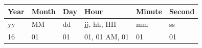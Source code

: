 \documentclass[12pt,]{article}
\begin{document}
\begin{longtable}[c]{@{}llllll@{}}
\toprule
\begin{minipage}[b]{0.08\columnwidth}\raggedright\strut
Year
\strut\end{minipage} &
\begin{minipage}[b]{0.09\columnwidth}\raggedright\strut
Month
\strut\end{minipage} &
\begin{minipage}[b]{0.07\columnwidth}\raggedright\strut
Day
\strut\end{minipage} &
\begin{minipage}[b]{0.20\columnwidth}\raggedright\strut
Hour
\strut\end{minipage} &
\begin{minipage}[b]{0.10\columnwidth}\raggedright\strut
Minute
\strut\end{minipage} &
\begin{minipage}[b]{0.10\columnwidth}\raggedright\strut
Second
\strut\end{minipage}\tabularnewline
\midrule
\endhead
\begin{minipage}[t]{0.08\columnwidth}\raggedright\strut
yy
\strut\end{minipage} &
\begin{minipage}[t]{0.09\columnwidth}\raggedright\strut
MM
\strut\end{minipage} &
\begin{minipage}[t]{0.07\columnwidth}\raggedright\strut
dd
\strut\end{minipage} &
\begin{minipage}[t]{0.20\columnwidth}\raggedright\strut
jj, hh, HH
\strut\end{minipage} &
\begin{minipage}[t]{0.10\columnwidth}\raggedright\strut
mm
\strut\end{minipage} &
\begin{minipage}[t]{0.10\columnwidth}\raggedright\strut
ss
\strut\end{minipage}\tabularnewline
\begin{minipage}[t]{0.08\columnwidth}\raggedright\strut
16
\strut\end{minipage} &
\begin{minipage}[t]{0.09\columnwidth}\raggedright\strut
01
\strut\end{minipage} &
\begin{minipage}[t]{0.07\columnwidth}\raggedright\strut
01
\strut\end{minipage} &
\begin{minipage}[t]{0.20\columnwidth}\raggedright\strut
01, 01 AM, 01
\strut\end{minipage} &
\begin{minipage}[t]{0.10\columnwidth}\raggedright\strut
01
\strut\end{minipage} &
\begin{minipage}[t]{0.10\columnwidth}\raggedright\strut
01
\strut\end{minipage}\tabularnewline
\bottomrule
\end{longtable}
\end{document}
